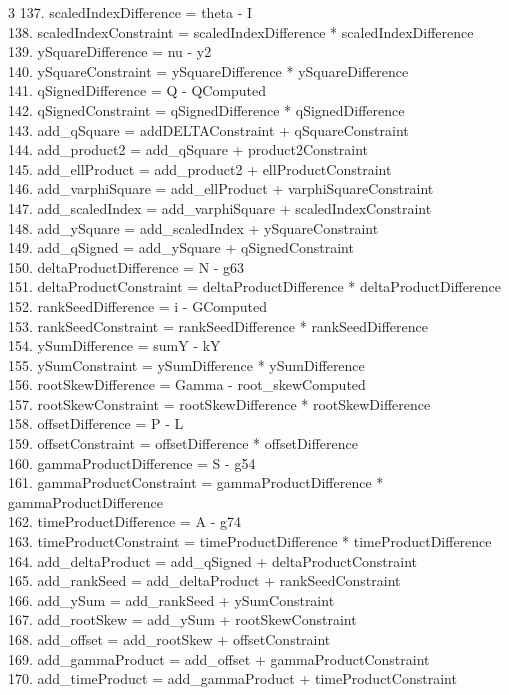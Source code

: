 \documentclass[10pt]{article}
\begin{document}
\begin{multicols}{3}
137. scaledIndexDifference = theta - I\\
138. scaledIndexConstraint = scaledIndexDifference * scaledIndexDifference\\
139. ySquareDifference = nu - y2\\
140. ySquareConstraint = ySquareDifference * ySquareDifference\\
141. qSignedDifference = Q - QComputed\\
142. qSignedConstraint = qSignedDifference * qSignedDifference\\
143. add\_qSquare = addDELTAConstraint + qSquareConstraint\\
144. add\_product2 = add\_qSquare + product2Constraint\\
145. add\_ellProduct = add\_product2 + ellProductConstraint\\
146. add\_varphiSquare = add\_ellProduct + varphiSquareConstraint\\
147. add\_scaledIndex = add\_varphiSquare + scaledIndexConstraint\\
148. add\_ySquare = add\_scaledIndex + ySquareConstraint\\
149. add\_qSigned = add\_ySquare + qSignedConstraint\\
150. deltaProductDifference = N - g63\\
151. deltaProductConstraint = deltaProductDifference * deltaProductDifference\\
152. rankSeedDifference = i - GComputed\\
153. rankSeedConstraint = rankSeedDifference * rankSeedDifference\\
154. ySumDifference = sumY - kY\\
155. ySumConstraint = ySumDifference * ySumDifference\\
156. rootSkewDifference = Gamma - root\_skewComputed\\
157. rootSkewConstraint = rootSkewDifference * rootSkewDifference\\
158. offsetDifference = P - L\\
159. offsetConstraint = offsetDifference * offsetDifference\\
160. gammaProductDifference = S - g54\\
161. gammaProductConstraint = gammaProductDifference * gammaProductDifference\\
162. timeProductDifference = A - g74\\
163. timeProductConstraint = timeProductDifference * timeProductDifference\\
164. add\_deltaProduct = add\_qSigned + deltaProductConstraint\\
165. add\_rankSeed = add\_deltaProduct + rankSeedConstraint\\
166. add\_ySum = add\_rankSeed + ySumConstraint\\
167. add\_rootSkew = add\_ySum + rootSkewConstraint\\
168. add\_offset = add\_rootSkew + offsetConstraint\\
169. add\_gammaProduct = add\_offset + gammaProductConstraint\\
170. add\_timeProduct = add\_gammaProduct + timeProductConstraint\\
\end{multicols}
\end{document}
